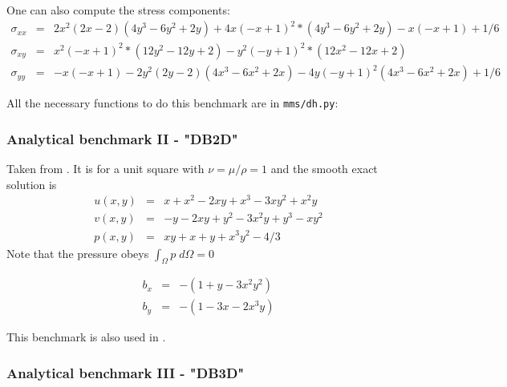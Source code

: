 One can also compute the stress components:
\begin{eqnarray}
\sigma_{xx} &=&  2x^2(2x - 2)(4y^3 - 6y^2 + 2y) + 4x(-x + 1)^2*(4y^3 - 6y^2 + 2y) - x(-x + 1) + 1/6 \\
\sigma_{xy} &=&  x^2(-x + 1)^2*(12y^2 - 12y + 2) - y^2(-y + 1)^2*(12x^2 - 12x + 2) \\
\sigma_{yy} &=&  -x(-x + 1) - 2y^2(2y - 2)(4x^3 - 6x^2 + 2x) - 4y(-y + 1)^2(4x^3 - 6x^2 + 2x) + 1/6
\end{eqnarray}


All the necessary functions to do this benchmark are in {\tt mms/dh.py}:



\subsubsection{Analytical benchmark II \label{mms2} - "DB2D"}

Taken from \cite{dobo04,bodg06}. It is for a unit square with $\nu=\mu/\rho=1$ and the smooth exact solution is
\begin{eqnarray}
u(x,y) &=& x+x^2 - 2xy+x^3 - 3xy^2 + x^2y \\
v(x,y) &=& -y-2xy+y^2 -3x^2y + y^3 - xy^2 \\
p(x,y) &=& xy+x+y+x^3y^2 - 4/3
\end{eqnarray}
Note that the pressure obeys $\int_{\Omega} p \; d\Omega = 0$

\begin{eqnarray}
b_x &=& - (1+y-3x^2y^2) \\
b_y &=& - (1-3x-2x^3y) 
\end{eqnarray}

This benchmark is also used in \cite{wosp14}.

\subsubsection{Analytical benchmark III \label{mms3} - "DB3D"}

